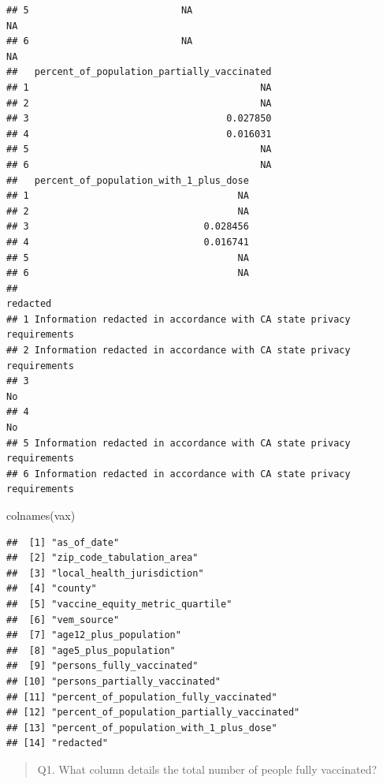 \documentclass[
]{article}
\newenvironment{Shaded}{\begin{snugshade}}{\end{snugshade}}
\newcommand{\FunctionTok}[1]{\textcolor[rgb]{0.00,0.00,0.00}{#1}}
\newcommand{\NormalTok}[1]{#1}
\begin{document}
\begin{verbatim}
## 5                           NA                                     NA
## 6                           NA                                     NA
##   percent_of_population_partially_vaccinated
## 1                                         NA
## 2                                         NA
## 3                                   0.027850
## 4                                   0.016031
## 5                                         NA
## 6                                         NA
##   percent_of_population_with_1_plus_dose
## 1                                     NA
## 2                                     NA
## 3                               0.028456
## 4                               0.016741
## 5                                     NA
## 6                                     NA
##                                                                redacted
## 1 Information redacted in accordance with CA state privacy requirements
## 2 Information redacted in accordance with CA state privacy requirements
## 3                                                                    No
## 4                                                                    No
## 5 Information redacted in accordance with CA state privacy requirements
## 6 Information redacted in accordance with CA state privacy requirements
\end{verbatim}

\begin{Shaded}
\begin{Highlighting}[]
\FunctionTok{colnames}\NormalTok{(vax)}
\end{Highlighting}
\end{Shaded}

\begin{verbatim}
##  [1] "as_of_date"                                
##  [2] "zip_code_tabulation_area"                  
##  [3] "local_health_jurisdiction"                 
##  [4] "county"                                    
##  [5] "vaccine_equity_metric_quartile"            
##  [6] "vem_source"                                
##  [7] "age12_plus_population"                     
##  [8] "age5_plus_population"                      
##  [9] "persons_fully_vaccinated"                  
## [10] "persons_partially_vaccinated"              
## [11] "percent_of_population_fully_vaccinated"    
## [12] "percent_of_population_partially_vaccinated"
## [13] "percent_of_population_with_1_plus_dose"    
## [14] "redacted"
\end{verbatim}

\begin{quote}
Q1. What column details the total number of people fully vaccinated?
\end{quote}
\end{document}
